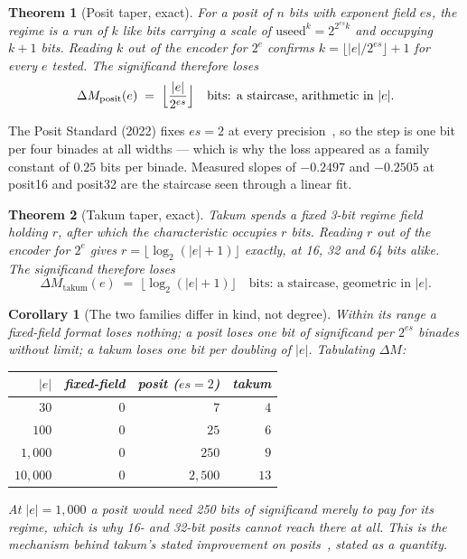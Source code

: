 \documentclass[11pt]{article}
\newtheorem{theorem}{Theorem}
\newtheorem{corollary}{Corollary}
\theoremstyle{definition}
\begin{document}
\begin{theorem}[Posit taper, exact]\label{thm:posit}
For a posit of $n$ bits with exponent field $es$, the regime is a run of $k$ like
bits carrying a scale of $\mathrm{useed}^k = 2^{2^{es}k}$ and occupying $k+1$ bits.
Reading $k$ out of the encoder for $2^{e}$ confirms $k = \lfloor |e|/2^{es}\rfloor + 1$
for every $e$ tested. The significand therefore loses
\[
  \Delta M_{\text{posit}}(e) \;=\; \Bigl\lfloor \frac{|e|}{2^{es}} \Bigr\rfloor
  \quad\text{bits: a staircase, arithmetic in } |e| .
\]
\end{theorem}

The Posit Standard (2022) fixes $es = 2$ at every precision~\cite{gustafson}, so
the step is one bit per four binades at all widths --- which is why the loss
appeared as a family constant of $0.25$ bits per binade. Measured slopes of
$-0.2497$ and $-0.2505$ at posit16 and posit32 are the staircase seen through a
linear fit.

\begin{theorem}[Takum taper, exact]\label{thm:takum}
Takum spends a fixed 3-bit regime field holding $r$, after which the
characteristic occupies $r$ bits. Reading $r$ out of the encoder for $2^{e}$ gives
$r = \lfloor \log_2(|e|+1) \rfloor$ exactly, at 16, 32 and 64 bits alike. The
significand therefore loses
\[
  \Delta M_{\text{takum}}(e) \;=\; \bigl\lfloor \log_2(|e|+1) \bigr\rfloor
  \quad\text{bits: a staircase, geometric in } |e| .
\]
\end{theorem}

\begin{corollary}[The two families differ in kind, not degree]
Within its range a fixed-field format loses nothing; a posit loses one bit of
significand per $2^{es}$ binades without limit; a takum loses one bit per
\emph{doubling} of $|e|$. Tabulating $\Delta M$:

\begin{center}
\begin{tabular}{rrrr}
\toprule
$|e|$ & fixed-field & posit ($es{=}2$) & takum \\
\midrule
$30$      & $0$ & $7$    & $4$ \\
$100$     & $0$ & $25$   & $6$ \\
$1{,}000$   & $0$ & $250$  & $9$ \\
$10{,}000$  & $0$ & $2{,}500$ & $13$ \\
\bottomrule
\end{tabular}
\end{center}

At $|e| = 1{,}000$ a posit would need 250 bits of significand merely to pay for
its regime, which is why 16- and 32-bit posits cannot reach there at all. This is
the mechanism behind takum's stated improvement on posits~\cite{takum}, stated as
a quantity.
\end{corollary}
\end{document}
